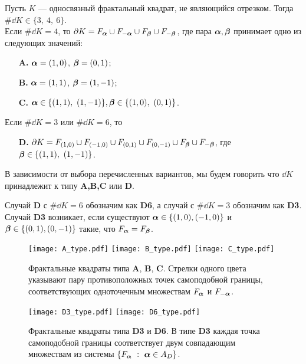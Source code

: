 \begin{theorem}\label{ssboundary}

Пусть $K$ --- односвязный фрактальный квадрат, не являющийся отрезком.
Тогда $\#\dd K\in\{3,\ 4,\ 6\}$. \\
Если $\#\dd K=4$, то  $\partial K=F_{\bm{\alpha}}\cup F_{-{\bm{\alpha}}}\cup F_{\bm{\beta}}\cup F_{-{\bm{\beta}}}$, где   пара  ${\bm{\alpha}},{\bm{\beta}}$ принимает одно из следующих значений:
	\begin{itemize}
	\item[{\bf A.}] ${\bm{\alpha}}=(1,0)$, $ {\bm{\beta}}=(0,1)$;
	\item[{\bf B.}] ${\bm{\alpha}}=(1,1)$, $ {\bm{\beta}}=(1,-1)$;
	\item[{\bf C.}] $\bma\in\{(1,1),\ (1,-1)\},\bmb\in\{(1,0),\ (0,1)\}$.
	\end{itemize}
 Если $\#\dd K=3$ или $\#\dd K=6$, то
\begin{itemize}
	\item[{\bf D.}] $\partial K=F_{(1,0)}\cup F_{(-1,0)}\cup F_{(0,1)}\cup F_{(0,-1)}\cup F_{\bm{\beta}}\cup F_{-{\bm{\beta}}}$, где ${\bm{\beta}}\in\{(1,1),\ (1,-1)\}$.
	\end{itemize}
\end{theorem}

В зависимости от выбора перечисленных  вариантов, мы будем говорить что $\dd K$ принадлежит к типу {\bf A,B,C} или {\bf D}.

\begin{remark}
Случай {\bf D} с $\#\dd K=6$ обозначим как {\bf D6}, а случай с $\#\dd K=3$ обозначим как {\bf D3}.
Случай {\bf D3} возникает, если существуют ${\bm{\alpha}}\in\{(1,0),(-1,0)\}$ и ${\bm{\beta}}\in\{(0,1),(0,-1)\}$ такие, что $F_{\bm{\alpha}}=F_{\bm{\beta}}$.
\end{remark}

\begin{figure}[H]
\centering
\texttt{[image: A\_type.pdf]}
\hfill
\texttt{[image: B\_type.pdf]}
\hfill
\texttt{[image: C\_type.pdf]}
\caption{Фрактальные квадраты типа {\bf A}, {\bf B}, {\bf C}. Стрелки одного цвета указывают пару противоположных точек самоподобной границы, соответствующих одноточечным множествам $F_{\bm{\alpha}}$ и $F_{-{\bm{\alpha}}}$. }
\end{figure}

\begin{figure}[H]
\texttt{[image: D3\_type.pdf]}
\hfill
\texttt{[image: D6\_type.pdf]}
\hfill
\caption{Фрактальные квадраты типа  {\bf D3} и {\bf D6}.  В типе {\bf D3} каждая точка самоподобной границы соответствует двум совпадающим множествам из системы $\{F_{\bm{\alpha}}\ :\ {\bm{\alpha}}\in A_D\}$.}
\end{figure}

